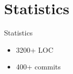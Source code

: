 \section{Statistics}

\begin{frame}{Statistics}
\begin{itemize}
	\item 3200+ LOC
	\item 400+ commits
\end{itemize}
\end{frame}
